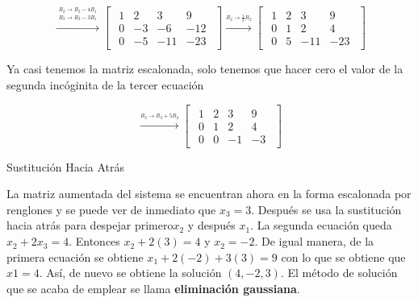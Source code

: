 \documentclass{article}
\begin{document}
\begin{equation*}
    \xrightarrow{\overset{\begin{aligned} R_2 \rightarrow R_2 - 4R_1 \\ R_3 \rightarrow R_3 - 3R_1\end{aligned}}{}} 
    \begin{bmatrix}
        \begin{array}{rrr|r}
            1& 2 & 3 & 9\\
            0 &-3 &-6 &-12 \\
            0&-5 &-11 &-23
        \end{array}
    \end{bmatrix}
    \xrightarrow{\stackrel{R_2 \rightarrow \frac{1}{3}R_2}{}}
    \begin{bmatrix}
        \begin{array}{rrr|r}
            1 & 2 & 3 & 9\\
            0 & 1 & 2 & 4\\
            0 & 5 &-11&-23
        \end{array}
    \end{bmatrix}
\end{equation*}

Ya casi tenemos la matriz escalonada, solo tenemos que hacer cero el valor de la segunda incóginita de la tercer ecuación

\begin{equation*}
    \xrightarrow{\overset{R_3 \rightarrow R_3 + 5R_2}{}} 
    \begin{bmatrix}
        \begin{array}{rrr|r}
            1 & 2 & 3 & 9\\
            0 & 1 & 2 & 4 \\
            0 & 0 &-1 &-3
        \end{array}
    \end{bmatrix}
\end{equation*}

\begin{large}
    Sustitución Hacia Atrás
\end{large}

La matriz aumentada del sistema se encuentran ahora en la forma escalonada por renglones y se puede ver de inmediato que $x_3 = 3$. Después se usa la sustitución hacia atrás para despejar primero$x_2$ y después $x_1$. La segunda ecuación queda $x_2 + 2x_3 = 4$. Entonces $x_2 + 2(3) = 4$ y $x_2 =-2$. De igual manera, de la primera ecuación se obtiene $x_1 + 2(-2) + 3(3) = 9$  con lo que se obtiene que $x1 = 4$. Así, de nuevo se obtiene la solución $(4, -2, 3)$. El método de solución que se acaba de emplear se llama \textbf{eliminación gaussiana}.
\end{document}
